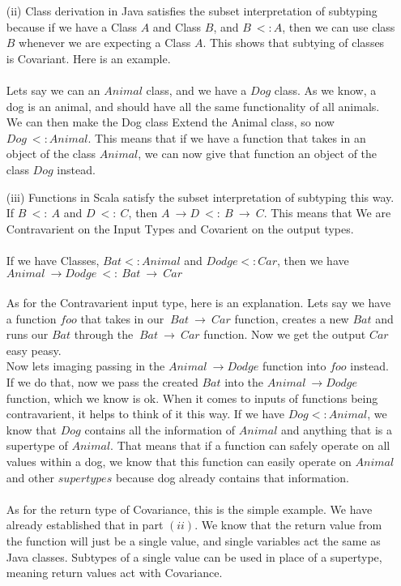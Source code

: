 \documentclass[11pt]{article}
\begin{document}
\begin{enumerate}
\begin{enumerate}
\begin{enumerate}
\item[(ii)]  Class derivation in Java satisfies the subset interpretation of subtyping because if we have a Class $A$ and Class $B$, and $B\ <: A$, then we can use class $B$ whenever we are expecting a Class $A$.  This shows that subtying of classes is Covariant.  Here is an example.
\\\\
Lets say we can an $Animal$ class, and we have a $Dog$ class.  As we know, a dog is an animal, and should have all the same functionality of all animals.  We can then make the Dog class Extend the Animal class, so now $Dog\ <: Animal$.  This means that if we have a function that takes in an object of the class $Animal$, we can now give that function an object of the class $Dog$ instead.\\
\item[(iii)]  Functions in Scala satisfy the subset interpretation of subtyping this way. \\
If $B\ <:\ A$ and $D\ <:\ C$, then $A\ \rightarrow D\ <:\ B\ \rightarrow\ C$.  This means that We are Contravarient on the Input Types and Covarient on the output types.\\ \\
If we have Classes, $Bat <: Animal$ and $Dodge <: Car$, then we have \\
$Animal\ \rightarrow Dodge\ <:\ Bat\ \rightarrow\ Car$
\\ \\
As for the Contravarient input type, here is an explanation.   Lets say we have a function $foo$ that takes in our $\ Bat\ \rightarrow\ Car$ function, creates a new $Bat$ and runs our $Bat$ through the  $\ Bat\ \rightarrow\ Car$ function.  Now we get the output $Car$ easy peasy.
\\ 
Now lets imaging passing in the $Animal\ \rightarrow Dodge$ function into $foo$ instead.  If we do that, now we pass the created $Bat$ into the $Animal\ \rightarrow Dodge$ function, which we know is ok.  When it comes to inputs of functions being contravarient, it helps to think of it this way.  If we have $Dog <: Animal$, we know that $Dog$ contains all the information of $Animal$ and anything that is a supertype of $Animal$.  That means that if a function can safely operate on all values within a dog, we know that this function can easily operate on $Animal$ and other $supertypes$ because dog already contains that information.\\ \\
As for the return type of Covariance, this is the simple example.  We have already established that in part $(ii)$.  We know that the return value from the function will just be a single value, and single variables act the same as Java classes.  Subtypes of a single value can be used in place of a supertype, meaning return values act with Covariance.
\\
\end{enumerate}


\end{enumerate}
\end{enumerate}
\end{document}
